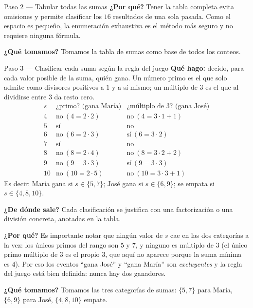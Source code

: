 \documentclass[11pt]{article}
\begin{document}
\begin{sol}
\begin{paso}{Paso 2 --- Tabular todas las sumas}
\textbf{¿Por qué?} Tener la tabla completa evita omisiones y permite clasificar los $16$
resultados de una sola pasada. Como el espacio es pequeño, la enumeración exhaustiva es el
método más seguro y no requiere ninguna fórmula.

\textbf{¿Qué tomamos?} Tomamos la tabla de sumas como base de todos los conteos.
\end{paso}

\begin{paso}{Paso 3 --- Clasificar cada suma según la regla del juego}
\textbf{Qué hago:} decido, para cada valor posible de la suma, quién gana. Un número primo es
el que solo admite como divisores positivos a $1$ y a sí mismo; un múltiplo de $3$ es el que
al dividirse entre $3$ da resto cero.
\[
\begin{array}{c|l|l}
s & \text{¿primo? (gana María)} & \text{¿múltiplo de 3? (gana José)}\\\hline
4 & \text{no}\ (4=2\cdot 2) & \text{no}\ (4=3\cdot1+1)\\
5 & \text{sí} & \text{no}\\
6 & \text{no}\ (6=2\cdot 3) & \text{sí}\ (6=3\cdot 2)\\
7 & \text{sí} & \text{no}\\
8 & \text{no}\ (8=2\cdot 4) & \text{no}\ (8=3\cdot2+2)\\
9 & \text{no}\ (9=3\cdot 3) & \text{sí}\ (9=3\cdot 3)\\
10 & \text{no}\ (10=2\cdot 5) & \text{no}\ (10=3\cdot3+1)
\end{array}
\]
Es decir: María gana si $s\in\{5,7\}$; José gana si $s\in\{6,9\}$; se empata si
$s\in\{4,8,10\}$.

\textbf{¿De dónde sale?} Cada clasificación se justifica con una factorización o una división
concreta, anotadas en la tabla.

\textbf{¿Por qué?} Es importante notar que ningún valor de $s$ cae en las dos categorías a la
vez: los únicos primos del rango son $5$ y $7$, y ninguno es múltiplo de $3$ (el único primo
múltiplo de $3$ es el propio $3$, que aquí no aparece porque la suma mínima es $4$). Por eso
los eventos ``gana José'' y ``gana María'' son \emph{excluyentes} y la regla del juego está
bien definida: nunca hay dos ganadores.

\textbf{¿Qué tomamos?} Tomamos las tres categorías de sumas: $\{5,7\}$ para María, $\{6,9\}$
para José, $\{4,8,10\}$ empate.
\end{paso}


\end{sol}
\end{document}
